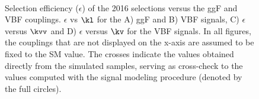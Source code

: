 \begin{figure}[htbp!]
\captionsetup[subfigure]{justification=centering}
\centering
{}
\\
\caption[Selection efficiency ($\epsilon$) of the 2016 selections versus the ggF and VBF couplings]{Selection efficiency ($\epsilon$) of the 2016 selections versus the ggF and VBF couplings. $\epsilon$ vs $\kl$ for the A) ggF and B) VBF signals, C) $\epsilon$ versus $\kvv$ and D) $\epsilon$ versus $\kv$ for the VBF signals. In all figures, the couplings that are not displayed on the x-axis are assumed to be fixed to the SM value. The crosses indicate the values obtained directly from the simulated samples, serving as cross-check to the values computed with the signal modeling procedure (denoted by the full circles).}
\label{fig:eff_sel_ggf_vbf_2016}
\end{figure}


